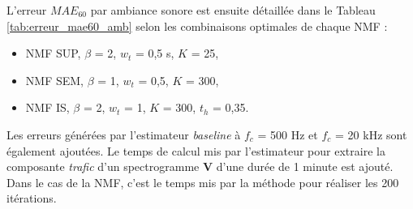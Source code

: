 L'erreur $MAE_{60}$ par ambiance sonore est ensuite détaillée dans le Tableau \ref{tab:erreur_mae60_amb} selon les combinaisons optimales de chaque NMF : 

\begin{itemize}
\item NMF SUP, $\beta$ = 2, $w_t$ = 0,5 s, $K$ = 25,
\item NMF SEM, $\beta$ = 1, $w_t$ = 0,5, $K$ = 300,
\item NMF IS, $\beta$ = 2, $w_t$ = 1, $K$ = 300, $t_h$ = 0,35.
\end{itemize}

Les erreurs générées par l'estimateur \textit{baseline} à $f_c$ = 500 Hz et $f_c$ = 20 kHz sont également ajoutées. Le temps de calcul mis par l'estimateur pour extraire la composante \textit{trafic} d'un spectrogramme $\mathbf{V}$ d'une durée de 1 minute est ajouté. Dans le cas de la NMF, c'est le temps mis par la méthode pour réaliser les 200 itérations. 

\begin{table}[h]
\centering
\caption{Erreurs $MAE_{60}$ les plus faibles selon les estimateurs NMF pour chaque méthode dans sa combinaison optimale de modalités avec les estimateurs \textit{baseline} à 500 Hz et 20 kHz. En gras-rouge, les erreurs globales les plus faibles, en gras-noir, les erreurs de la NMF inférieures à l'estimateur \textit{baseline} $f_c$ = 500 Hz.}
\label{tab:erreur_mae60_amb}
\end{table}


